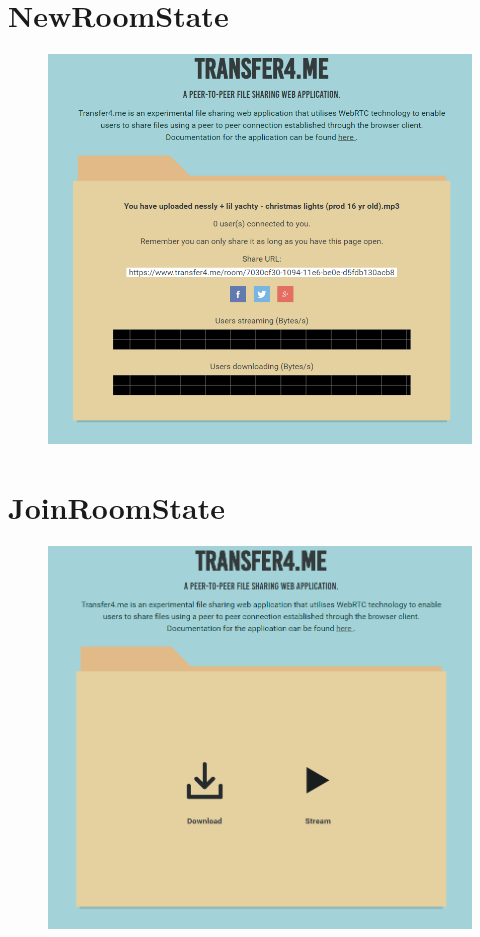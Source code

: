 \documentclass[]{report}
\begin{document}
	\section{NewRoomState}
		\begin{figure}[H]
			\centering
			\includegraphics[scale=0.6]{newroomstate.png}
		\end{figure}	
	\section{JoinRoomState}
		\begin{figure}[H]
			\centering
			\includegraphics[scale=0.6]{joinroomstate.png}
		\end{figure}	
\end{document}
